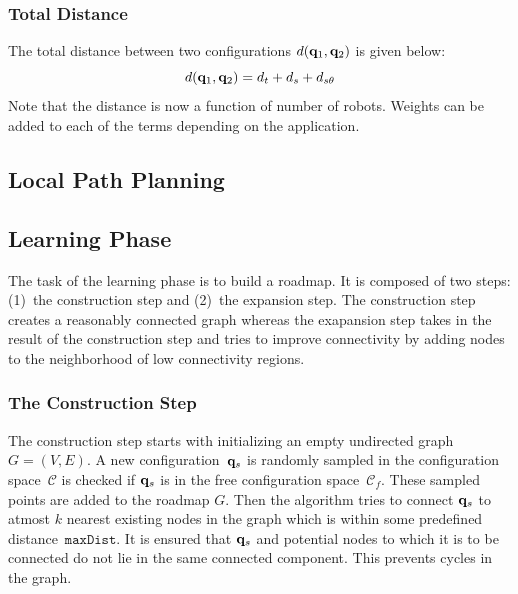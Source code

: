 \documentclass[12pt,a4paper, onecolumn]{IEEEtran}
\begin{document}
\subsubsection{Total Distance}
The total distance between two configurations $d(\mathbf{q}_1, \mathbf{q}_2)$ is given below:
\begin{equation}
  d(\mathbf{q}_1, \mathbf{q}_2) = d_t +d_s +d_{s\theta}
  \label{eqn:dF}
\end{equation}
Note that the distance is now a function of number of robots. Weights can be added to
each of the terms depending on the application.
\subsection{Local Path Planning}

\subsection{Learning Phase}
The task of the learning phase is to build a roadmap. It is composed of two steps: (1)~the construction step and (2)~the expansion step. The construction step creates a reasonably connected graph whereas the exapansion step takes in the result of the construction step and tries to improve connectivity by adding nodes to the neighborhood of low connectivity regions.
\subsubsection{The Construction Step}
The construction step starts with initializing an empty undirected graph $G=(V,E)$. A new configuration~$\mathbf{q}_s$ is randomly sampled in the configuration space~$\mathcal C$ is checked if $\mathbf{q}_s$ is in the free configuration space~$\mathcal C_f$. These sampled points are added to the roadmap $G$. Then the algorithm tries to connect $\mathbf{q}_s$ to atmost $k$ nearest existing nodes in the graph which is within some predefined distance~${\texttt {maxDist}}$. It is ensured that $\mathbf{q}_s$ and potential nodes to which it is to be connected do not lie in the same connected component. This prevents cycles in the graph.



\end{document}
